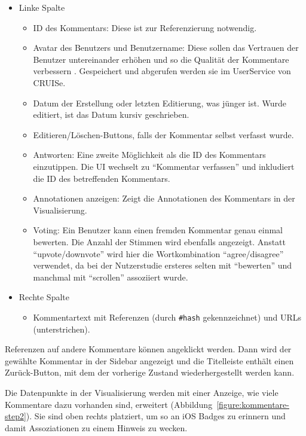 \documentclass[
	headsepline,
	footsepline,
	fontsize=12pt,
	bibliography=totoc
]{scrbook}
\begin{document}
\begin{itemize}
	\item Linke Spalte
	\begin{itemize}
		\item ID des Kommentars: Diese ist zur Referenzierung notwendig.
		\item Avatar des Benutzers und Benutzername: Diese sollen das Vertrauen der Benutzer untereinander erhöhen und so die Qualität der Kommentare verbessern \cite{Chiu2006}. Gespeichert und abgerufen werden sie im UserService von CRUISe.
		\item Datum der Erstellung oder letzten Editierung, was jünger ist. Wurde editiert, ist das Datum kursiv geschrieben.
		\item Editieren/Löschen-Buttons, falls der Kommentar selbst verfasst wurde.
		\item Antworten: Eine zweite Möglichkeit als die ID des Kommentars einzutippen. Die UI wechselt zu \enquote{Kommentar verfassen} und inkludiert die ID des betreffenden Kommentars.
		\item Annotationen anzeigen: Zeigt die Annotationen des Kommentars in der Visualisierung.
		\item Voting: Ein Benutzer kann einen fremden Kommentar genau einmal bewerten. Die Anzahl der Stimmen wird ebenfalls angezeigt. Anstatt \enquote{upvote/downvote} wird hier die Wortkombination \enquote{agree/disagree} verwendet, da bei der Nutzerstudie ersteres selten mit \enquote{bewerten} und manchmal mit \enquote{scrollen} assoziiert wurde.
	\end{itemize}
	\item Rechte Spalte
	\begin{itemize}
		\item Kommentartext mit Referenzen (durch \texttt{\#hash} gekennzeichnet) und URLs (unterstrichen).
	\end{itemize}
\end{itemize}

Referenzen auf andere Kommentare können angeklickt werden. Dann wird der gewählte Kommentar in der Sidebar angezeigt und die Titelleiste enthält einen Zurück-Button, mit dem der vorherige Zustand wiederhergestellt werden kann.

Die Datenpunkte in der Visualisierung werden mit einer Anzeige, wie viele Kommentare dazu vorhanden sind, erweitert (Abbildung~\ref{figure:kommentare-step2}). Sie sind oben rechts platziert, um so an iOS Badges zu erinnern und damit Assoziationen zu einem Hinweis zu wecken.
\end{document}
